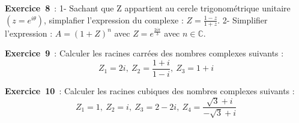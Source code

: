 \documentclass[12pt, a4paper]{article}
\begin{document}
{\bf Exercice~8}~: 1- Sachant que Z appartient au cercle trigonométrique unitaire $(z = e^{i\theta})$, simplafier l'expression du complexe : $Z = \frac{1-z}{1+z}$.
2- Simplifier l'expression : $A = (1+Z)^n$ avec $Z=e^\frac{2i\pi}{3}$ avec $n\in\mathbb{C}$.

{\bf Exercice~9}~: Calculer les racines carrées des nombres complexes suivants :
\begin{equation*}
Z_{1}=2i,~Z_{2}=\frac{1+i}{1-i},~Z_{3}=1+i
\end{equation*}

{\bf Exercice~10}~: Calculer les racines cubiques des nombres complexes suivants :
\begin{equation*}
Z_{1}=1,~Z_{2}=i,~Z_{3}=2-2i,~Z_{4}=\frac{\sqrt{3}+i}{-\sqrt{3}+i}
\end{equation*}
\end{document}
